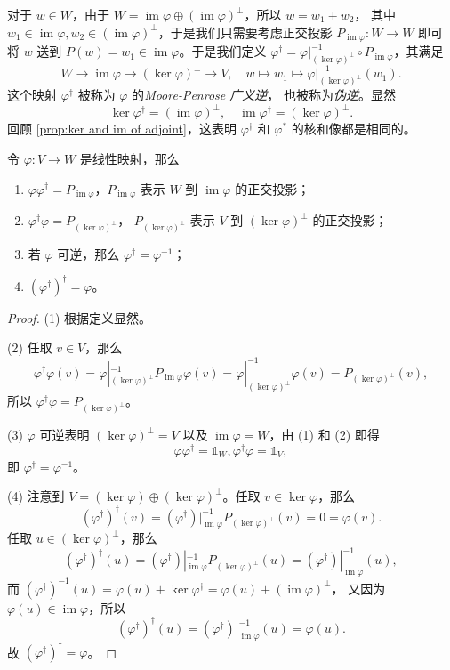 \documentclass[fontset=none,zihao=-4]{Notes}
\DeclareMathOperator\im{im}
\begin{document}
对于 $w\in W$，由于 $W=\im\varphi\oplus (\im\varphi)^\bot$，所以 $w=w_1+w_2$，
其中 $w_1\in\im\varphi,w_2\in(\im\varphi)^\bot$，于是我们只需要考虑正交投影
$P_{\im\varphi}:W\to W$ 即可将 $w$ 送到 $P(w)=w_1\in \im\varphi$。于是我们定义
$\varphi^\dagger=\varphi|_{(\ker\varphi)^\bot}^{-1}\circ P_{\im\varphi}$，其满足
\[
  W\to \im\varphi\to (\ker\varphi)^\bot\to V,\quad
  w\mapsto w_1\mapsto \varphi|_{(\ker\varphi)^\bot}^{-1}(w_1).
\]
这个映射 $\varphi^\dagger$ 被称为 $\varphi$ 的\emph{Moore-Penrose 广义逆}，
也被称为\emph{伪逆}。显然
\[
  \ker\varphi^\dagger=(\im\varphi)^\bot,\quad 
  \im\varphi^\dagger=(\ker\varphi)^\bot.  
\]
回顾 \autoref{prop:ker and im of adjoint}，这表明 $\varphi^\dagger$
和 $\varphi^*$ 的核和像都是相同的。

\begin{proposition}\label{prop:property of Moore-Penrose}
  令 $\varphi:V\to W$ 是线性映射，那么
  \begin{enumerate}
    \item $\varphi\varphi^\dagger=P_{\im\varphi}$，$P_{\im\varphi}$
    表示 $W$ 到 $\im\varphi$ 的正交投影；
    \item $\varphi^\dagger\varphi=P_{(\ker\varphi)^\bot}$，
    $P_{(\ker\varphi)^\bot}$ 表示 $V$ 到 $(\ker\varphi)^\bot$ 的正交投影；
    \item 若 $\varphi$ 可逆，那么 $\varphi^\dagger=\varphi^{-1}$；
    \item $(\varphi^\dagger)^\dagger=\varphi$。
  \end{enumerate} 
\end{proposition}
\begin{proof}
  (1) 根据定义显然。

  (2) 任取 $v\in V$，那么
  \[
    \varphi^\dagger\varphi(v)=\varphi|_{(\ker\varphi)^\bot}^{-1}  
    P_{\im\varphi}\varphi(v)=\varphi|_{(\ker\varphi)^\bot}^{-1}\varphi(v)
    =P_{(\ker\varphi)^\bot}(v),
  \]
  所以 $\varphi^\dagger\varphi=P_{(\ker\varphi)^\bot}$。

  (3) $\varphi$ 可逆表明 $(\ker\varphi)^\bot=V$ 以及 $\im\varphi=W$，由 (1) 和 (2)
  即得
  \[
    \varphi\varphi^\dagger=\mathbb{1}_{W},\varphi^{\dagger}\varphi=\mathbb{1}_V,  
  \]
  即 $\varphi^\dagger=\varphi^{-1}$。

  (4) 注意到 $V=(\ker\varphi)\oplus(\ker\varphi)^\bot$。任取 $v\in\ker\varphi$，那么
  \[
    (\varphi^\dagger)^\dagger(v)=(\varphi^{\dagger})|_{\im\varphi}^{-1}
    P_{(\ker\varphi)^\bot}(v)=0=\varphi(v).
  \]
  任取 $u\in(\ker\varphi)^\bot$，那么
  \[
    (\varphi^\dagger)^\dagger(u)=(\varphi^{\dagger})|_{\im\varphi}^{-1}
    P_{(\ker\varphi)^\bot}(u)=(\varphi^\dagger)|_{\im\varphi}^{-1}(u),
  \]
  而 $(\varphi^{\dagger})^{-1}(u)=\varphi(u)+\ker\varphi^\dagger=\varphi(u)+(\im\varphi)^\bot$，
  又因为 $\varphi(u)\in\im\varphi$，所以 
  \[
    (\varphi^\dagger)^\dagger(u)=(\varphi^\dagger)|_{\im\varphi}^{-1}(u)=\varphi(u).
  \]
  故 $(\varphi^\dagger)^\dagger=\varphi$。
\end{proof}
\end{document}
